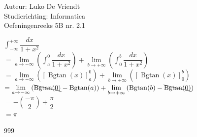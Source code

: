\documentclass[a4paper]{article}
\begin{document}
\noindent \large Auteur: Luko De Vriendt\\
\noindent \large Studierichting: Informatica\\
\noindent \large Oefeningenreeks 5B nr. 2.1\\

\medskip

\normalsize

$\displaystyle \int_{-\infty}^{+\infty} \dfrac{dx}{1 + x^2}$ \\

$=\lim\limits_{a \rightarrow -\infty} \left( \displaystyle \int_a^0 \dfrac{dx}{1 + x^2}\right) + \lim\limits_{b \rightarrow +\infty} \left (\displaystyle \int_0^b \dfrac{dx}{1 + x^2} \right )$ \\

$=\lim\limits_{a \rightarrow -\infty} \left( \left [\operatorname{Bgtan} (x) \right ]_a^0 \right) + \lim\limits_{b \rightarrow +\infty} \left ( \left [ \operatorname{Bgtan} (x) \right]_0^b \right )$ \\

$=\lim\limits_{a \rightarrow -\infty} \left ( \bcancel{\operatorname{Bgtan} (0)} - \operatorname{Bgtan} (a) \right ) + \lim\limits_{b \rightarrow +\infty} \left (\operatorname{Bgtan} (b) - \bcancel{\operatorname{Bgtan} (0)} \right )$ \\ 

$= -\left ( \dfrac{-\pi}{2} \right ) + \dfrac{\pi}{2}$ \\

$= \pi$ \\

\begin{thebibliography}{999}
\end{thebibliography}
\end{document}

